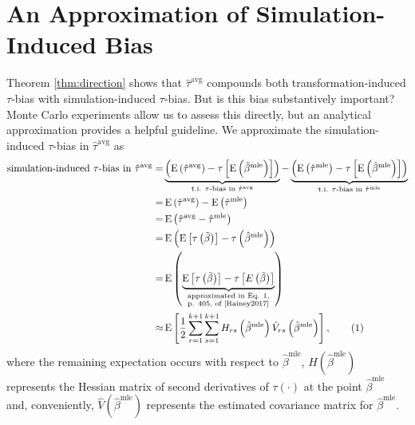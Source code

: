 \documentclass[11pt]{article}
\newcommand\numberthis{\addtocounter{equation}{1}\tag{\theequation}}
\DeclareMathOperator*{\E}{\text{E}}
\begin{document}
\section*{An Approximation of Simulation-Induced Bias}

Theorem \ref{thm:direction} shows that $\hat{\tau}^\text{avg}$ compounds both transformation-induced $\tau$-bias with simulation-induced $\tau$-bias. But is this bias substantively important? Monte Carlo experiments allow us to assess this directly, but an analytical approximation provides a helpful guideline.
We approximate the simulation-induced $\tau$-bias in $\hat{\tau}^\text{avg}$ as
\begin{align*}
\text{simulation-induced $\tau$-bias in } \hat{\tau}^\text{avg} =& \underbrace{\left( \E \left( \hat{\tau}^\text{avg}\right) - \tau \left[\E \left( \hat{\beta}^\text{mle} \right) \right] \right) }_{\text{t.i. } \tau\text{-bias in }\hat{\tau}^{\text{avg}}} - \underbrace{ \left( \E \left( \hat{\tau}^\text{mle}\right) -  \tau \left[\E \left( \hat{\beta}^\text{mle} \right) \right] \right)}_{\text{t.i. } \tau\text{-bias in }\hat{\tau}^{\text{mle}}}\\
=& \E \left( \hat{\tau}^\text{avg}\right) - \E \left( \hat{\tau}^\text{mle}\right)\\
=& \E \left( \hat{\tau}^\text{avg} - \hat{\tau}^\text{mle} \right)\\
=& \E \left(     \E \left[ \tau\left( \tilde{\beta} \right) \right]      -      \tau \left( \hat{\beta}^\text{mle} \right)     \right)\\
=& \E \left(     \underbrace{\E \left[ \tau\left( \tilde{\beta} \right) \right]      -      \tau \left[ E\left(  \tilde{\beta} \right)\right]}_{\substack{\text{approximated in Eq. 1,} \\ \text{p. 405, of \cite{Rainey2017}}}}   \right)\\
\approx & \E \left[ \dfrac{1}{2} \displaystyle \sum_{r = 1}^{k+1} \sum_{s = 1}^{k+1} H_{rs}\left( \hat{\beta}^\text{mle} \right) \hat{V}_{rs} \left( \hat{\beta}^{\text{mle}} \right) \right], \numberthis \label{eqn:avg-approx}
\end{align*}
where the remaining expectation occurs with respect to $\hat{\beta}^\text{mle}$, $H\left( \hat{\beta}^\text{mle} \right)$ represents the Hessian matrix of second derivatives of $\tau(\cdot)$ at the point $\hat{\beta}^\text{mle}$ and, conveniently, $\hat{V} \left( \hat{\beta}^{\text{mle}} \right)$ represents the estimated covariance matrix for $\hat{\beta}^\text{mle}$.
\end{document}

